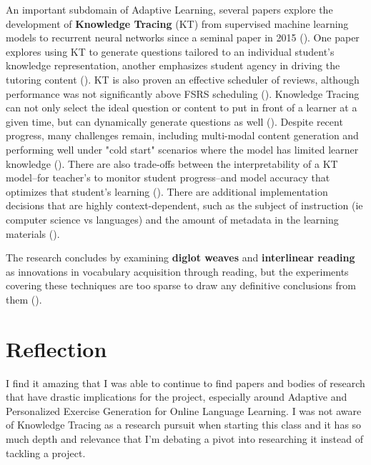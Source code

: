 \documentclass[
	letterpaper, %
]{jdf}
\newcommand{\pcite}[1]{(\cite{#1})}
\begin{document}
An important subdomain of Adaptive Learning, several papers explore the development of \textbf{Knowledge Tracing} (KT) from supervised machine learning models to recurrent neural networks since a seminal paper in 2015 \pcite{deep_knowledge_tracing}. One paper explores using KT to generate questions tailored to an individual student's knowledge representation, another emphasizes student agency in driving the tutoring content \pcite{question_generation_adaptive_education, llm_augmented_exercise_retrieval}. KT is also proven an effective scheduler of reviews, although performance was not significantly above FSRS scheduling \pcite{flashcard_scheduler_evolution}. Knowledge Tracing can not only select the ideal question or content to put in front of a learner at a given time, but can dynamically generate questions as well \pcite{generative_information_retrieval}. Despite recent progress, many challenges remain, including multi-modal content generation and performing well under "cold start" scenarios where the model has limited learner knowledge \pcite{knowledge_tracing_survey}. There are also trade-offs between the interpretability of a KT model–for teacher's to monitor student progress–and model accuracy that optimizes that student's learning \pcite{deep_knowledge_tracing}. There are additional implementation decisions that are highly context-dependent, such as the subject of instruction (ie computer science vs languages) and the amount of metadata in the learning materials \pcite{dkt_knowledge_tracing}.

The research concludes by examining \textbf{diglot weaves} and \textbf{interlinear reading} as innovations in vocabulary acquisition through reading, but the experiments covering these techniques are too sparse to draw any definitive conclusions from them \pcite{diglot_weave, hyplern_interlinear_reading}.

\section{Reflection}
I find it amazing that I was able to continue to find papers and bodies of research that have drastic implications for the project, especially around Adaptive and Personalized Exercise Generation for Online Language Learning. I was not aware of Knowledge Tracing as a research pursuit when starting this class and it has so much depth and relevance that I'm debating a pivot into researching it instead of tackling a project.
\end{document}
